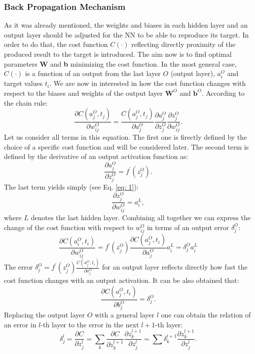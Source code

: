 \documentclass{emulateapj}
\begin{document}
\subsubsection{Back Propagation Mechanism}
\label{subsubsec: back propagation}

As it was already mentioned, the weights and biases in each hidden layer and an output layer should be adjusted for the NN to be able to reproduce its target. In order to do that, the cost function $C(\cdot)$ reflecting directly proximity of the produced result to the target is introduced. The aim now is to find optimal parameters \textbf{W} and \textbf{b} minimizing the cost function. In the most general case, $C(\cdot)$ is a function of an output from the last layer $O$ (output layer), $a_i^O$ and target values $t_i$. We are now in interested in how the cost function changes with respect to the biases and weights of the output layer $\textbf{W}^O$ and $\textbf{b}^O$. According to the chain rule:
\begin{equation}
    \frac{\partial C(a_j^O, t_j)}{\partial w_{ij}^O}=\frac{C(a_j^O, t_j)}{\partial a_{j}^O}\frac{\partial a_{j}^O}{\partial z_{j}^O}\frac{\partial z_{j}^O}{\partial w_{ij}^O}.
\end{equation}
Let us consider all terms in this equation. The first one is firectly defined by the choice of a specific cost function and will be considered later. The second term is defined by the derivative of an output activation function as:
\begin{equation}
    \frac{\partial a_{j}^O}{\partial z_{j}^O} = f^{\prime}(z_{j}^O).
\end{equation}
The last term yields simply (see Eq. \ref{eq: 1}):
\begin{equation}
    \frac{\partial z_{j}^O}{\partial w_{ij}^O}=a^L_i,
\end{equation}
where $L$ denotes the last hidden layer. Combining all together we can express the change of the cost function with respect to $w_{ij}^O$ in terms of an output error $\delta_{j}^O$:
\begin{equation}
    \frac{\partial C(a_i^O, t_i)}{\partial w_{ij}^O}=f^{\prime}(z_{j}^O)\frac{\partial C(a_j^O, t_i)}{\partial a_{j}^O}a^L_i= \delta_j^Oa^L_i
\end{equation}
The error $\delta_j^O=f^{\prime}(z_{j}^O)\frac{C(a_j^O, t_i)}{\partial a_{j}^O}$ for an output layer reflects directly how fast the cost function changes with an output activation. It can be also obtained that:
\begin{equation}
    \frac{\partial C(a_j^O, t_i)}{\partial b_{j}^O}=\delta_j^O.
\end{equation}
Replacing the output layer $O$ with a general layer $l$ one can obtain the relation of an error in $l$-th layer to the error in the next $l+1$-th layer:
\begin{equation}
\label{eq: 2}
    \delta_j^l=\frac{\partial C}{\partial z_{j}^l}=\sum_k \frac{\partial C}{\partial z_{k}^{l+1}}\frac{\partial z_{k}^{l+1}}{\partial z_{j}^{l}}=\sum \delta_k^{l+1}\frac{\partial z_{k}^{l+1}}{\partial z_{j}^{l}}.
\end{equation}
\end{document}
